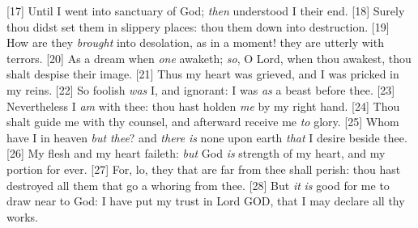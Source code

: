 [17] \textcolor[cmyk]{0.99998,1,0,0}{Until I went into  sanctuary of God; \emph{then} understood I their end.}
[18] \textcolor[cmyk]{0.99998,1,0,0}{Surely thou didst set them in slippery places: thou  them down into destruction.}
[19] \textcolor[cmyk]{0.99998,1,0,0}{How are they \emph{brought} into desolation, as in a moment! they are utterly  with terrors.}
[20] \textcolor[cmyk]{0.99998,1,0,0}{As a dream when \emph{one} awaketh; \emph{so}, O Lord, when thou awakest, thou shalt despise their image.}
[21] \textcolor[cmyk]{0.99998,1,0,0}{Thus my heart was grieved, and I was pricked in my reins.}
[22] \textcolor[cmyk]{0.99998,1,0,0}{So foolish \emph{was} I, and ignorant: I was \emph{as} a beast before thee.}
[23] \textcolor[cmyk]{0.99998,1,0,0}{Nevertheless I \emph{am}  with thee: thou hast holden \emph{me} by my right hand.}
[24] \textcolor[cmyk]{0.99998,1,0,0}{Thou shalt guide me with thy counsel, and afterward receive me \emph{to} glory.}
[25] \textcolor[cmyk]{0.99998,1,0,0}{Whom have I in heaven \emph{but} \emph{thee}? and \emph{there} \emph{is} none upon earth \emph{that} I desire beside thee.}
[26] \textcolor[cmyk]{0.99998,1,0,0}{My flesh and my heart faileth: \emph{but} God \emph{is}  strength of my heart, and my portion for ever.}
[27] \textcolor[cmyk]{0.99998,1,0,0}{For, lo, they that are far from thee shall perish: thou hast destroyed all them that go a whoring from thee.}
[28] \textcolor[cmyk]{0.99998,1,0,0}{But \emph{it} \emph{is} good for me to draw near to God: I have put my trust in  Lord GOD, that I may declare all thy works.}